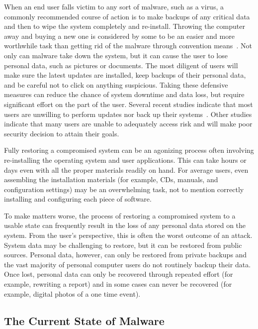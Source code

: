 When an end user falls victim to any sort of malware, such as a virus, a commonly recommended course of action is to make backups of any critical data and then to wipe the system completely and re-install. Throwing the computer away and buying a new one is considered by some to be an easier and more worthwhile task than getting rid of the malware through convention means~\cite{NewYork_Times_2005, KOMU-TV_2010}. Not only can malware take down the system, but it can cause the user to lose personal data, such as pictures or documents. The most diligent of users will make sure the latest updates are installed, keep backups of their personal data, and be careful not to click on anything suspicious. Taking these defensive measures can reduce the chance of system downtime and data loss, but require significant effort on the part of the user. Several recent studies indicate that most users are unwilling to perform updates nor back up their systems~\cite{ Acronis_2009, The_Register_2009, Microsoft_TechNet_2010}. Other studies indicate that many users are unable to adequately access risk and will make poor security decision to attain their goals\cite{sunshine_wolf_2009, motiee_chi_2010}.

Fully restoring a compromised system can be an agonizing process often involving re-installing the operating system and user applications. This can take hours or days even with all the proper materials readily on hand. For average users, even assembling the installation materials (for example, CDs, manuals, and configuration settings) may be an overwhelming task, not to mention correctly installing and configuring each piece of software.
 
To make matters worse, the process of restoring a compromised system to a usable state can frequently result in the loss of any personal data stored on the system. From the user’s perspective, this is often the worst outcome of an attack. System data may be challenging to restore, but it can be restored from public sources. Personal data, however, can only be restored from private backups and the vast majority of personal computer users do not routinely backup their data. Once lost, personal data can only be recovered through repeated effort (for example, rewriting a report) and in some cases can never be recovered (for example, digital photos of a one time event).

\subsection{The Current State of Malware}

